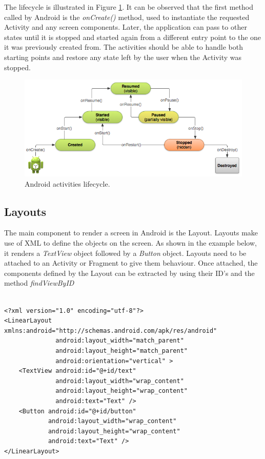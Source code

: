 The lifecycle is illustrated in Figure \ref{fig:activities_lifecycle}. It can be observed that the first method called by Android is the \textit{onCreate()} method, used to instantiate the requested Activity and any screen components. Later, the application can pass to other states until it is stopped and started again from a different entry point to the one it was previously created from. The activities should be able to handle both starting points and restore any state left by the user when the Activity was stopped. 

\begin{figure}[H]
\begin{adjustbox}{width=1\textwidth,center=\textwidth}
  \centering
  \includegraphics[scale=1]{images/basic-lifecycle.png}
\end{adjustbox}
  \caption[Android activities lifecycle]{Android activities lifecycle.\footnotemark}
  \label{fig:activities_lifecycle}
\end{figure}

\subsection{Layouts}
The main component to render a screen in Android is the Layout. Layouts make use of XML to define the objects on the screen. As shown in the example below, it renders a \textit{TextView} object followed by a \textit{Button} object. Layouts need to be attached to an Activity or Fragment to give them behaviour. Once attached, the components defined by the Layout can be extracted by using their ID's and the method \textit{findViewByID}
\begin{verbatim}

<?xml version="1.0" encoding="utf-8"?>
<LinearLayout xmlns:android="http://schemas.android.com/apk/res/android"
              android:layout_width="match_parent"
              android:layout_height="match_parent"
              android:orientation="vertical" >
    <TextView android:id="@+id/text"
              android:layout_width="wrap_content"
              android:layout_height="wrap_content"
              android:text="Text" />
    <Button android:id="@+id/button"
            android:layout_width="wrap_content"
            android:layout_height="wrap_content"
            android:text="Text" />
</LinearLayout>
\end{verbatim}

